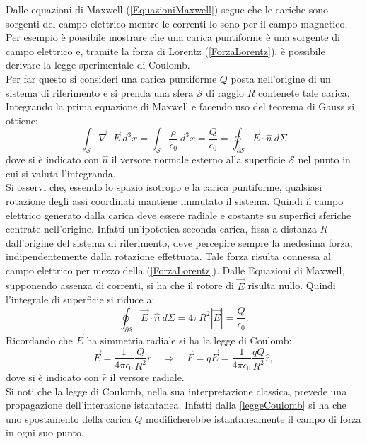 Dalle equazioni di Maxwell (\ref{EquazioniMaxwell}) segue che le cariche sono sorgenti del campo 
elettrico mentre le correnti lo sono per 
il campo magnetico. Per esempio è possibile mostrare che una carica puntiforme è una sorgente di campo elettrico e, 
tramite la forza di Lorentz (\ref{ForzaLorentz}), è possibile derivare la legge sperimentale di Coulomb.\\
Per far questo si consideri una carica puntiforme $Q$ posta nell'origine di un sistema di riferimento e si prenda una sfera $\mathcal{S}$ di raggio $R$ 
contenete tale carica. Integrando la prima equazione di Maxwell e facendo uso del teorema di Gauss si ottiene:
\begin{equation*}
	\int_\mathcal{S}\vec{\nabla}\cdot\vec{E}\ d^3x=\int_\mathcal{S}\frac{\rho}{\epsilon_0}\ d^3x=\frac{Q}{\epsilon_0}=\oint_{\partial\mathcal{S}}\vec{E}\cdot\hat{n}\ d\Sigma
\end{equation*}
dove si è indicato con $\hat{n}$ il versore normale esterno alla superficie $\mathcal{S}$ nel punto in cui si valuta l'integranda.\\
Si osservi che, essendo lo spazio 
isotropo e la carica puntiforme, qualsiasi rotazione degli assi coordinati mantiene immutato il sistema. Quindi
il campo elettrico generato dalla carica deve essere radiale e costante su superfici sferiche centrate nell'origine. Infatti un'ipotetica seconda carica, 
fissa a distanza $R$ dall'origine del sistema di riferimento, deve percepire sempre la medesima forza, indipendentemente dalla rotazione effettuata.
Tale forza risulta connessa al campo elettrico per mezzo della (\ref{ForzaLorentz}). Dalle Equazioni di Maxwell, supponendo assenza di correnti, 
si ha che il rotore di $\vec{E}$ risulta nullo. Quindi l'integrale di superficie si riduce a:
\begin{equation*}
	\oint_{\partial\mathcal{S}}\vec{E}\cdot\hat{n}\ d\Sigma=4\pi R^2|\vec{E}|=\frac{Q}{\epsilon_0}.
\end{equation*}	
Ricordando che $\vec{E}$ ha simmetria radiale si ha la legge di Coulomb:
\begin{equation}
	\vec{E}=\frac{1}{4\pi\epsilon_0}\frac{Q}{R^2}\hat{r} \quad \Rightarrow \quad \vec{F}=q\vec{E}=\frac{1}{4\pi\epsilon_0}\frac{qQ}{R^2}\hat{r},\label{leggeCoulomb}
\end{equation} 
dove si è indicato con $\hat{r}$ il versore radiale.\\
Si noti che la legge di Coulomb, nella sua interpretazione classica, prevede una propagazione dell'interazione istantanea. Infatti dalla \eqref{leggeCoulomb} si ha che uno spostamento della carica $Q$ modificherebbe istantaneamente il campo di forza in ogni suo punto.\\

